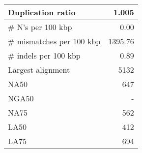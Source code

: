 \documentclass[12pt,a4paper]{article}
\begin{document}
\begin{table}[ht]
\begin{center}
\begin{tabular}{|l*{1}{|r}|}
Duplication ratio & 1.005 \\ \hline
\# N's per 100 kbp & 0.00 \\ \hline
\# mismatches per 100 kbp & 1395.76 \\ \hline
\# indels per 100 kbp & 0.89 \\ \hline
Largest alignment & 5132 \\ \hline
NA50 & 647 \\ \hline
NGA50 & - \\ \hline
NA75 & 562 \\ \hline
LA50 & 412 \\ \hline
LA75 & 694 \\ \hline
\end{tabular}
\end{center}
\end{table}
\end{document}
